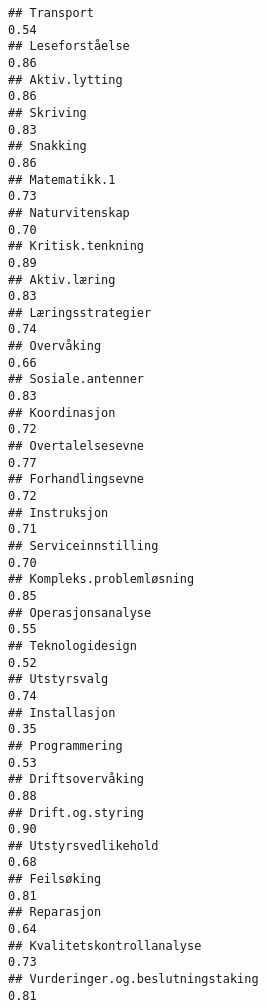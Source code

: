 \documentclass[
]{article}
\begin{document}
\begin{verbatim}
## Transport                                                                        0.54
## Leseforståelse                                                                   0.86
## Aktiv.lytting                                                                    0.86
## Skriving                                                                         0.83
## Snakking                                                                         0.86
## Matematikk.1                                                                     0.73
## Naturvitenskap                                                                   0.70
## Kritisk.tenkning                                                                 0.89
## Aktiv.læring                                                                     0.83
## Læringsstrategier                                                                0.74
## Overvåking                                                                       0.66
## Sosiale.antenner                                                                 0.83
## Koordinasjon                                                                     0.72
## Overtalelsesevne                                                                 0.77
## Forhandlingsevne                                                                 0.72
## Instruksjon                                                                      0.71
## Serviceinnstilling                                                               0.70
## Kompleks.problemløsning                                                          0.85
## Operasjonsanalyse                                                                0.55
## Teknologidesign                                                                  0.52
## Utstyrsvalg                                                                      0.74
## Installasjon                                                                     0.35
## Programmering                                                                    0.53
## Driftsovervåking                                                                 0.88
## Drift.og.styring                                                                 0.90
## Utstyrsvedlikehold                                                               0.68
## Feilsøking                                                                       0.81
## Reparasjon                                                                       0.64
## Kvalitetskontrollanalyse                                                         0.73
## Vurderinger.og.beslutningstaking                                                 0.81

\end{verbatim}
\end{document}
